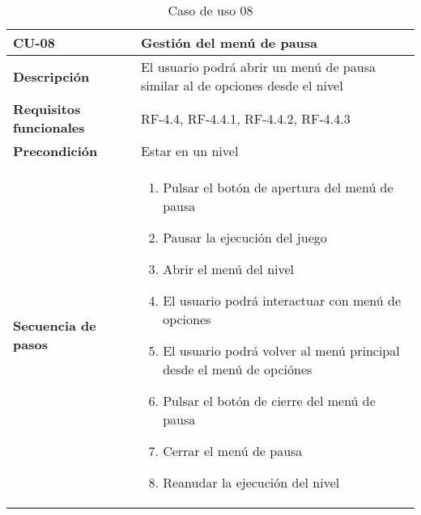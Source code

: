 \begin{longtable}{l|l}
\caption{Caso de uso 08}\\
\begin{minipage}{0.25\columnwidth}
\textbf{CU-08} 
\end{minipage}
&
\begin{minipage}{0.65\columnwidth}
Gestión del menú de pausa
\end{minipage}
\\ \hline

\begin{minipage}{0.25\columnwidth}
\textbf{Descripción} 
\end{minipage}
&
\begin{minipage}{0.65\columnwidth}
El usuario podrá abrir un menú de pausa similar al de opciones desde el nivel
\end{minipage}
\\ \hline

\begin{minipage}{0.25\columnwidth}
\textbf{Requisitos funcionales} 
\end{minipage}
&
\begin{minipage}{0.65\columnwidth}
RF-4.4, RF-4.4.1, RF-4.4.2, RF-4.4.3
\end{minipage}
\\ \hline

\begin{minipage}{0.25\columnwidth}
\textbf{Precondición} 
\end{minipage}
&
\begin{minipage}{0.65\columnwidth}
Estar en un nivel
\end{minipage}
\\ \hline

\begin{minipage}{0.25\columnwidth}
\textbf{Secuencia de pasos} 
\end{minipage}
&
\begin{minipage}{0.65\columnwidth}
\begin{enumerate}
\item
Pulsar el botón de apertura del menú de pausa
\item
Pausar la ejecución del juego
\item
Abrir el menú del nivel
\item
El usuario podrá interactuar con menú de opciones
\item
El usuario podrá volver al menú principal desde el menú de opciónes
\item
Pulsar el botón de cierre del menú de pausa
\item
Cerrar el menú de pausa
\item
Reanudar la ejecución del nivel
\end{enumerate}
\end{minipage}
\\ \hline


\end{longtable}
